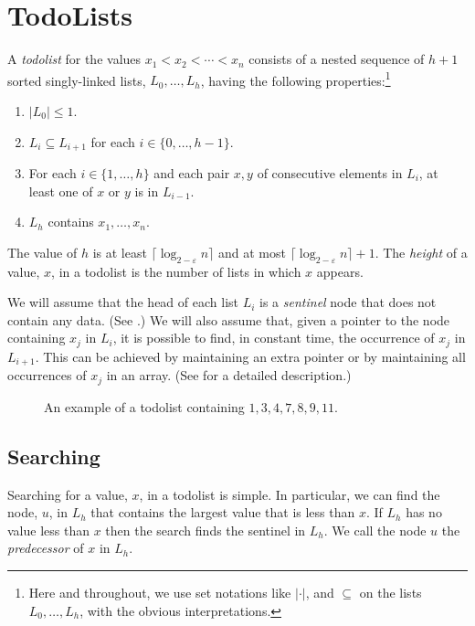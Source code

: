 \documentclass{patmorin}
\begin{document}
\section{TodoLists}

A \emph{todolist} for the values $x_1<x_2<\cdots<x_n$ consists of a
nested sequence of $h+1$ sorted singly-linked lists, $L_0,\ldots,L_h$,
having the following properties:\footnote{Here and throughout, we use set
notations like $|\cdot|$, and $\subseteq$ on the lists $L_0,\ldots,L_h$,
with the obvious interpretations.}

\begin{enumerate}
  \item $|L_0| \le 1$.
  \item $L_i\subseteq L_{i+1}$ for each $i\in\{0,\ldots,h-1\}$.
  \item For each $i\in\{1,\ldots,h\}$ and each pair $x,y$ of consecutive
        elements in $L_i$, at least one of $x$ or $y$ is in $L_{i-1}$.
  \item $L_h$ contains $x_1,\ldots,x_n$.
\end{enumerate}

The value of $h$ is at least $\lceil \log_{2-\varepsilon} n\rceil$ and
at most $\lceil \log_{2-\varepsilon} n\rceil+1$.  The \emph{height} of
a value, $x$, in a todolist is the number of lists in which $x$ appears.

We will assume that the head of each list $L_i$ is a \emph{sentinel} node that does not contain any data. (See .)  We will also
assume that, given a pointer to the node containing $x_j$ in $L_i$, it is
possible to find, in constant time, the occurrence of $x_j$ in $L_{i+1}$.
This can be achieved by maintaining an extra pointer or by maintaining
all occurrences of $x_j$ in an array. (See  for
a detailed description.)

\begin{figure}
  \caption{An example of a todolist containing $1,3,4,7,8,9,11$.}
\end{figure}




\subsection{Searching}

Searching for a value, $x$, in a todolist is simple. In particular, we
can find the node, $u$, in $L_h$ that contains the largest value that
is less than $x$. If $L_h$ has no value less than $x$ then the search
finds the sentinel in $L_h$.  We call the node $u$ the \emph{predecessor}
of $x$ in $L_h$.
\end{document}
